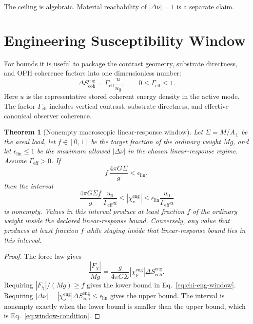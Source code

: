 \documentclass[11pt]{article}
\numberwithin{equation}{section}
\newtheorem{theorem}{Theorem}[section]
\theoremstyle{remark}
\newcommand{\chieng}{\chi_\nu^{\mathrm{eng}}}
\newcommand{\scoheng}{S_{\mathrm{coh}}^{\mathrm{eng}}}
\newcommand{\Gammaeff}{\Gamma_{\mathrm{eff}}}
\begin{document}
The ceiling is algebraic. Material reachability of \(|\Delta\nu|=1\) is a
separate claim.

\section{Engineering Susceptibility Window}

For bounds it is useful to package the contrast geometry, substrate directness,
and OPH coherence factors into one dimensionless number:
\begin{equation}
\Delta\scoheng
=
\Gammaeff\frac{u}{u_0},
\qquad
0\le \Gammaeff\le 1.
\label{eq:Gamma-definition}
\end{equation}
Here \(u\) is the representative stored coherent energy density in the active
mode. The factor \(\Gammaeff\) includes vertical contrast, substrate directness,
and effective canonical observer coherence.

\begin{theorem}[Nonempty macroscopic linear-response window]
Let \(\Sigma=M/A_\perp\) be the areal load, let \(f\in[0,1]\) be the target
fraction of the ordinary weight \(Mg\), and let \(\epsilon_{\mathrm{lin}}\le 1\)
be the maximum allowed \(|\Delta\nu|\) in the chosen linear-response regime.
Assume \(\Gammaeff>0\). If
\begin{equation}
f\,\frac{4\pi G\Sigma}{g}
<
\epsilon_{\mathrm{lin}},
\label{eq:window-condition}
\end{equation}
then the interval
\begin{equation}
\boxed{
\frac{4\pi G\Sigma f}{g}\,
\frac{u_0}{\Gammaeff u}
\le
|\chieng|
\le
\epsilon_{\mathrm{lin}}
\frac{u_0}{\Gammaeff u}
}
\label{eq:chi-eng-window}
\end{equation}
is nonempty. Values in this interval produce at least fraction \(f\) of the
ordinary weight inside the declared linear-response bound. Conversely, any
value that produces at least fraction \(f\) while staying inside that
linear-response bound lies in this interval.
\end{theorem}

\begin{proof}
The force law gives
\[
\frac{|F_\chi|}{Mg}
=
\frac{g}{4\pi G\Sigma}|\chieng|\Delta\scoheng.
\]
Requiring \(|F_\chi|/(Mg)\ge f\) gives the lower bound in
Eq.~\eqref{eq:chi-eng-window}. Requiring
\(|\Delta\nu|=|\chieng|\Delta\scoheng\le\epsilon_{\mathrm{lin}}\) gives the upper
bound. The interval is nonempty exactly when the lower bound is smaller than the
upper bound, which is Eq.~\eqref{eq:window-condition}.
\end{proof}
\end{document}
